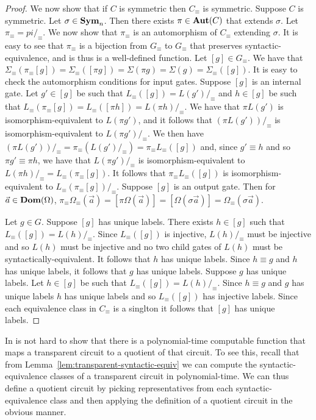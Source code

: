 \documentclass[../paper.tex]{subfiles}
\begin{document}
\begin{proof}
  We now show that if $C$ is symmetric then $C_\equiv$ is symmetric. Suppose $C$
  is symmetric. Let $\sigma \in \text{\textbf{Sym}}_n$. Then there exists $\pi \in \text{\textbf{Aut}}(C)$
  that extends $\sigma$. Let $\pi_\equiv = pi /_\equiv$. We now show that
  $\pi_\equiv$ is an automorphism of $C_\equiv$ extending $\sigma$. It is easy
  to see that $\pi_\equiv$ is a bijection from $G_\equiv$ to $G_\equiv$ that
  preserves syntactic-equivalence, and is thus is a well-defined function. Let
  $[g] \in G_\equiv$. We have that $\Sigma_\equiv (\pi_\equiv [g]) =
  \Sigma_\equiv ([\pi g]) = \Sigma (\pi g) = \Sigma (g) = \Sigma_\equiv ([g])$.
  It is easy to check the automorphism conditions for input gates. Suppose $[g]$
  is an internal gate. Let $g' \in [g]$ be such that $L_\equiv([g]) = L(g')
  /_\equiv$ and $h \in [g]$ be such that $L_\equiv(\pi_\equiv[g]) = L_\equiv
  ([\pi h]) = L(\pi h) /_\equiv$. We have that $\pi L(g')$ is
  isomorphism-equivalent to $L(\pi g')$, and it follows that $(\pi
  L(g'))/_\equiv$ is isomorphism-equivalent to $L(\pi g') /_\equiv$. We then
  have $(\pi L(g'))/_\equiv = \pi_\equiv (L(g') /_\equiv) = \pi_\equiv L_\equiv
  ([g])$ and, since $g' \equiv h$ and so $\pi g' \equiv \pi h$, we have that
  $L(\pi g')/_\equiv$ is isomorphism-equivalent to $L(\pi h) /_\equiv =
  L_\equiv(\pi_\equiv[g])$. It follows that $\pi_\equiv L_\equiv ([g])$ is
  isomorphism-equivalent to $L_\equiv(\pi_\equiv [g]) /_\equiv$. Suppose $[g]$
  is an output gate. Then for $\vec{a} \in \text{\textbf{Dom}} (\Omega)$, $\pi_\equiv
  \Omega_\equiv (\vec{a}) = [\pi \Omega (\vec{a})] = [\Omega (\sigma \vec{a})] =
  \Omega_\equiv (\sigma \vec{a})$.

  Let $g \in G$. Suppose $[g]$ has unique labels. There exists $h \in [g]$ such
  that $L_\equiv([g]) = L(h) /_\equiv$. Since $L_\equiv([g])$ is injective,
  $L(h) /_\equiv$ must be injective and so $L(h)$ must be injective and no two
  child gates of $L(h)$ must be syntactically-equivalent. It follows that $h$
  has unique labels. Since $h \equiv g$ and $h$ has unique labels, it follows
  that $g$ has unique labels. Suppose $g$ has unique labels. Let $h \in [g]$ be
  such that $L_\equiv([g]) = L(h) /_\equiv$. Since $h \equiv g$ and $g$ has
  unique labels $h$ has unique labels and so $L_\equiv([g])$ has injective
  labels. Since each equivalence class in $C_\equiv$ is a singlton it follows
  that $[g]$ has unique labels.
\end{proof}

In is not hard to show that there is a polynomial-time computable function that
maps a transparent circuit to a quotient of that circuit. To see this, recall
that from Lemma~\ref{lem:transparent-syntactic-equiv} we can compute the
syntactic-equivalence classes of a transparent circuit in polynomial-time. We
can thus define a quotient circuit by picking representatives from each
syntactic-equivalence class and then applying the definition of a quotient
circuit in the obvious manner.
\end{document}
